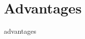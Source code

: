 \renewcommand{\thechapter}{}{}
\renewcommand{\chaptername}{}{}
\cleardoublepage
{}
{}
\chapter*{Advantages} %


advantages
